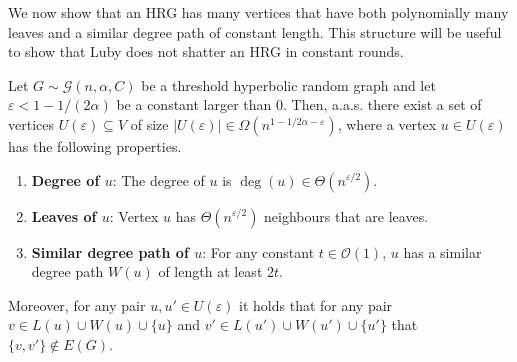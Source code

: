 \documentclass[letterpaper,11pt]{article}
\newcommand{\eps}{\varepsilon}
\newcommand{\aas}{a.a.s.\xspace}
\newcommand{\1}{\mathbb I}
\newcommand{\hrg}{\mathcal{G}(n, \alpha, C)}
\newcommand{\bigO}{\mathcal{O}}
\begin{document}
%
We now show that an HRG has many vertices that have both polynomially many leaves and a similar degree path of constant length. This structure will be useful to show that Luby does not shatter an HRG in constant rounds.
%
\begin{lemma}\label{lem:luby-obstruction}
    Let $G \sim \hrg$ be a threshold hyperbolic random graph and let $\eps < 1 - 1/(2\alpha)$ be a constant larger than $0$. Then, \aas there exist a set of vertices $U(\eps) \subseteq V$ of size $|U(\eps)| \in \Omega\left(n^{1 - 1/2\alpha -\eps}\right)$, where a vertex $u \in U(\eps)$ has the following properties.
%
    \begin{enumerate}
           \item\label{item:property1}\textbf{Degree of $u$}: The degree of $u$ is $\deg(u) \in \Theta(n^{\eps / 2})$.
        \item\label{item:property2}\textbf{Leaves of $u$}: Vertex $u$ has $\Theta(n^{\eps / 2})$ neighbours that are leaves.
        \item\label{item:property3}\textbf{Similar degree path of $u$}: For any constant $t \in \bigO(1)$, $u$ has a similar degree path $W(u)$ of length at least $2t$.
    \end{enumerate}
     Moreover, for any pair $u, u' \in U(\eps)$ it holds that for any pair $v \in L(u) \cup W(u) \cup \{u\}$ and $v' \in L(u') \cup W(u') \cup \{u'\}$ that $\{v,v'\} \not\in E(G)$.
%
\end{lemma}
%
\end{document}
